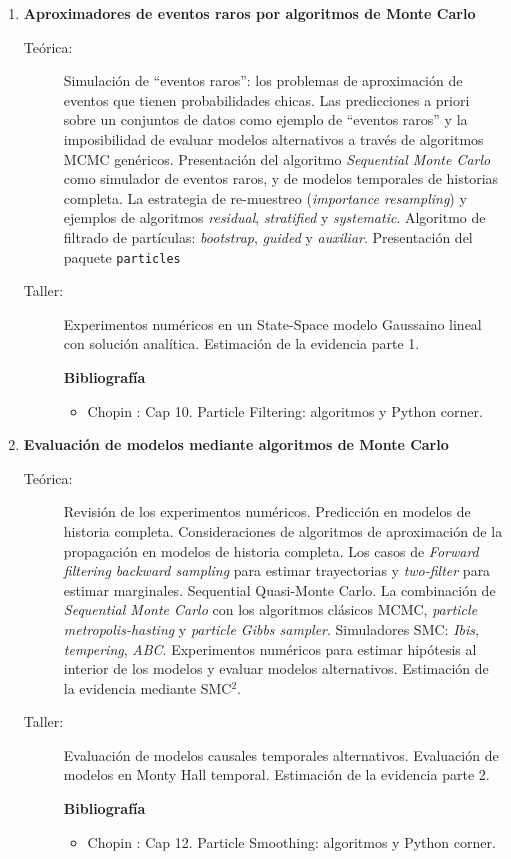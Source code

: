 \documentclass[10pt]{article}
\begin{document}
\begin{enumerate}
\item \textbf{Aproximadores de eventos raros por algoritmos de Monte Carlo}
\vspace{-0.15cm}
\begin{description}
\item[Teórica:] Simulación de ``eventos raros'': los problemas de aproximación de eventos que tienen probabilidades chicas.
Las predicciones a priori sobre un conjuntos de datos como ejemplo de ``eventos raros'' y la imposibilidad de evaluar modelos alternativos a través de algoritmos MCMC genéricos.
Presentación del algoritmo \emph{Sequential Monte Carlo} como simulador de eventos raros, y de modelos temporales de historias completa.
La estrategia de re-muestreo (\emph{importance resampling}) y ejemplos de algoritmos \emph{residual}, \emph{stratified} y \emph{systematic}.
Algoritmo de filtrado de partículas: \emph{bootstrap}, \emph{guided} y \emph{auxiliar}.
Presentación del paquete \texttt{particles}
\item[Taller:] Experimentos numéricos en un State-Space modelo Gaussaino lineal con solución analítica. Estimación de la evidencia parte 1.
\item[] \textbf{Bibliografía}
\begin{itemize}
\item Chopin \cite{chopin2020}: Cap 10. Particle Filtering: algoritmos y Python corner.
\end{itemize}
\end{description}


\item \textbf{Evaluación de modelos mediante algoritmos de Monte Carlo}
\vspace{-0.15cm}
\begin{description}
\item[Teórica:] Revisión de los experimentos numéricos.
Predicción en modelos de historia completa.
Consideraciones de algoritmos de aproximación de la propagación en modelos de historia completa.
Los casos de \emph{Forward filtering backward sampling} para estimar trayectorias y \emph{two-filter} para estimar marginales. Sequential Quasi-Monte Carlo. La combinación de \emph{Sequential Monte Carlo} con los algoritmos clásicos MCMC, \emph{particle metropolis-hasting} y \emph{particle Gibbs sampler}.
Simuladores SMC: \emph{Ibis}, \emph{tempering}, \emph{ABC}.
Experimentos numéricos para estimar hipótesis al interior de los modelos y evaluar modelos alternativos.
Estimación de la evidencia mediante SMC$^2$.
\item[Taller:] Evaluación de modelos causales temporales alternativos. Evaluación de modelos en Monty Hall temporal.  Estimación de la evidencia parte 2.
\item[] \textbf{Bibliografía}
\begin{itemize}
\item Chopin \cite{chopin2020}: Cap 12. Particle Smoothing: algoritmos y Python corner.
\end{itemize}
\end{description}



\end{enumerate}
\end{document}
